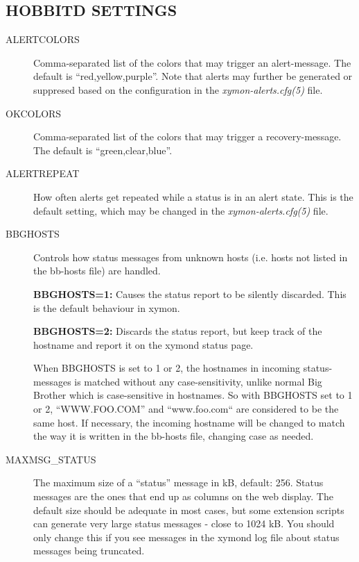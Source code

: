\subsection{HOBBITD SETTINGS}


 \begin{description}
\item[ALERTCOLORS] Comma-separated list of the colors that may trigger an alert-message. The default is ``red,yellow,purple''. Note that alerts may further be generated or suppresed based on the configuration in the \emph{xymon-alerts.cfg(5)}
 file. 

 

\item[OKCOLORS] Comma-separated list of the colors that may trigger a recovery-message. The default is ``green,clear,blue''. 

 

\item[ALERTREPEAT] How often alerts get repeated while a status is in an alert state. This is the default setting, which may be changed in the \emph{xymon-alerts.cfg(5)}
 file. 

 

\item[BBGHOSTS] Controls how status messages from unknown hosts (i.e. hosts not listed in the bb-hosts file) are handled. 

 \textbf{BBGHOSTS=1:}
 Causes the status report to be silently discarded. This is the default behaviour in xymon. 


 \textbf{BBGHOSTS=2:}
 Discards the status report, but keep track of the hostname and report it on the xymond status page. 


  When BBGHOSTS is set to 1 or 2, the hostnames in incoming status-messages is matched without any case-sensitivity, unlike normal Big Brother which is case-sensitive in hostnames. So with BBGHOSTS set to 1 or 2, ``WWW.FOO.COM'' and ``www.foo.com`` are considered to be the same host. If necessary, the incoming hostname will be changed to match the way it is written in the bb-hosts file, changing case as needed. 


 

\item[MAXMSG\_STATUS] The maximum size of a ``status'' message in kB, default: 256. Status messages are the ones that end up as columns on the web display. The default size should be adequate in most cases, but some extension scripts can generate very large status messages - close to 1024 kB. You should only change this if you see messages in the xymond log file about status messages being truncated. 


\end{description}
